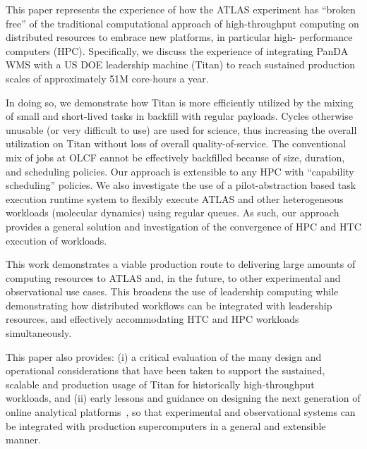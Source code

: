 
This paper represents the experience of how the ATLAS experiment has ``broken
free'' of the traditional computational approach of high-throughput computing
on distributed resources to embrace new platforms, in particular high-
performance computers (HPC). Specifically, we discuss the experience of
integrating PanDA WMS with a US DOE leadership machine (Titan) to reach
sustained production scales of approximately 51M core-hours a year.

In doing so, we demonstrate how Titan is more efficiently utilized by the
mixing of small and short-lived tasks in backfill with regular payloads.
Cycles otherwise unusable (or very difficult to use) are used for science,
thus increasing the overall utilization on Titan without loss of overall
quality-of-service. The conventional mix of jobs at OLCF cannot be
effectively backfilled because of size, duration, and scheduling policies.
Our approach is extensible to any HPC with ``capability scheduling''
policies.  We also investigate the use of a pilot-abstraction based task
execution runtime system to flexibly execute ATLAS and other heterogeneous
workloads (molecular dynamics) using regular queues. As such, our approach
provides a general solution and investigation of the convergence of HPC and
HTC execution of workloads.

This work demonstrates a viable production route to delivering large amounts
of computing resources to ATLAS and, in the future, to other experimental and
observational use cases.  This broadens the use of leadership computing while
demonstrating how distributed workflows can be integrated with leadership
resources, and effectively accommodating HTC and HPC workloads
simultaneously.

This paper also provides: (i) a critical evaluation of the many design and
operational considerations that have been taken to support the sustained,
scalable and production usage of Titan for historically high-throughput
workloads, and (ii) early lessons and guidance on designing the next
generation of online analytical platforms~\cite{foap-url},  so that
experimental and observational systems can be integrated with production
supercomputers in a general and extensible manner.
